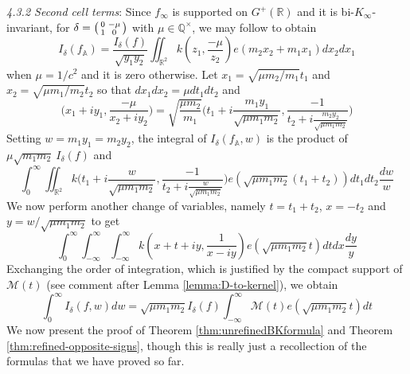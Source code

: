 \documentclass{article}
\numberwithin{equation}{section}
\begin{document}
\noindent \emph{4.3.2 Second cell terms}: Since $f_\infty$ is supported on $G^+(\mathbb{R})$ and it is bi-$K_\infty$-invariant, for $\delta=\begin{psmallmatrix}
    0 & -\mu \\ 1 & 0
\end{psmallmatrix}$ with $\mu \in \mathbb{Q}^\times$, we may follow \cite[\S 7.5.2]{KL-kuznetsov} to obtain
\begin{equation}\label{eq:unrefined-orbits}
    I_\delta(f_\mathbb{A})=\frac{I_\delta(f)}{\sqrt{y_1y_2}}\iint_{\mathbb{R}^2}k(z_1,\frac{-\mu}{z_2})e(m_2x_2+m_1x_1)dx_2dx_1
\end{equation}
when $\mu = 1/c^2$ and it is zero otherwise.
Let $x_1=\sqrt{\mu m_2/m_1}t_1$ and $x_2=\sqrt{\mu m_1/m_2}t_2$ so that $dx_1dx_2=\mu dt_1dt_2$ and 
$$\big(x_1+iy_1,\frac{-\mu}{x_2+iy_2} \big)= \sqrt{\frac{\mu m_2}{m_1}}\big( t_1+i\frac{m_1y_1}{\sqrt{\mu m_1m_2}},\frac{-1}{t_2+i\frac{m_2y_2}{\sqrt{\mu m_1m_2}}}\big)$$
Setting $w = m_1y_1=m_2y_2$, the integral of $I_\delta(f_\mathbb{A},w)$ is the product of $\mu\sqrt{m_1m_2}\ I_\delta(f)$ and 
$$\int_{0}^{\infty}\iint_{\mathbb{R}^2}k\big(t_1+i\frac{w}{\sqrt{\mu m_1m_2}},\frac{-1}{t_2+i\frac{w}{\sqrt{\mu m_1m_2}}}\big)e( \sqrt{\mu m_1m_2}(t_1+t_2))dt_1dt_2\frac{dw}{w}$$
We now perform another change of variables, namely $t=t_1+t_2$, $x=-t_2$ and $y=w/\sqrt{\mu m_1m_2}$ to get
$$\int_{0}^{\infty}\int_{-\infty}^{\infty}\int_{-\infty}^{\infty}k(x+t+iy,\frac{1}{x-iy})e( \sqrt{\mu m_1m_2}t)dtdx\frac{dy}{y}$$
Exchanging the order of integration, which is justified by the compact support of $\mathcal{M}(t)$ (see comment after Lemma \ref{lemma:D-to-kernel}), we obtain
\begin{equation}\label{eq:opposite-sign-geom-side}
\int_0^{\infty}I_\delta(f,w)dw=\sqrt{\mu m_1m_2}I_\delta(f)\int_{-\infty}^{\infty}\mathcal{M}(t)e( \sqrt{\mu m_1m_2}t)dt
\end{equation}
We now present the proof of Theorem \ref{thm:unrefinedBKformula} and Theorem \ref{thm:refined-opposite-signs}, though this is really just a recollection of the formulas that we have proved so far.
\end{document}
